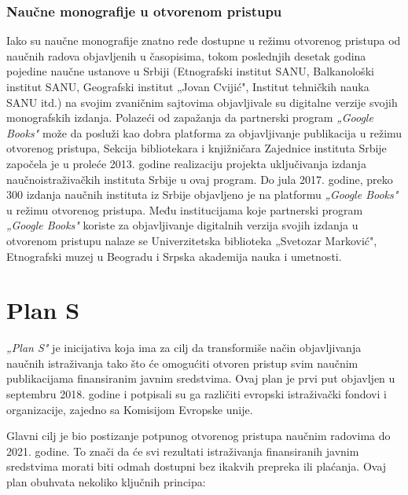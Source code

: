 \documentclass{article}
\begin{document}
\subsubsection{Naučne monografije u otvorenom pristupu}

Iako su naučne monografije znatno ređe dostupne u režimu otvorenog pristupa od naučnih radova objavljenih u časopisima, tokom poslednjih desetak godina pojedine naučne ustanove u Srbiji (Etnografski institut SANU, Balkanološki institut SANU, Geografski institut „Jovan Cvijić", Institut tehničkih nauka SANU itd.) na svojim zvaničnim sajtovima objavljivale su digitalne verzije svojih monografskih izdanja. Polazeći od zapažanja da partnerski program \textit{„Google Books"} može da posluži kao dobra platforma za objavljivanje publikacija u režimu otvorenog pristupa, Sekcija bibliotekara i knjižničara Zajednice instituta Srbije započela je u proleće 2013. godine realizaciju projekta uključivanja izdanja naučnoistraživačkih instituta Srbije u ovaj program. Do jula 2017. godine, preko 300 izdanja naučnih instituta iz Srbije objavljeno je na platformu \textit{„Google Books"} u režimu otvorenog pristupa\cite{sevkusic2017open}. Među institucijama koje partnerski program \textit{„Google Books"} koriste za objavljivanje digitalnih verzija svojih izdanja u otvorenom pristupu nalaze se Univerzitetska biblioteka „Svetozar Marković", Etnografski muzej u Beogradu i Srpska akademija nauka i umetnosti.


\section{Plan S}

\textit{„Plan S"} je inicijativa koja ima za cilj da transformiše način objavljivanja naučnih istraživanja tako što će omogućiti otvoren pristup svim naučnim publikacijama finansiranim javnim sredstvima. Ovaj plan je prvi put objavljen u septembru 2018. godine i potpisali su ga različiti evropski istraživački fondovi i organizacije, zajedno sa Komisijom Evropske unije.

Glavni cilj je bio postizanje potpunog otvorenog pristupa naučnim radovima do 2021. godine. To znači da će svi rezultati istraživanja finansiranih javnim sredstvima morati biti odmah dostupni bez ikakvih prepreka ili plaćanja. Ovaj plan obuhvata nekoliko ključnih principa\cite{baldwin2023athena}:
\end{document}
